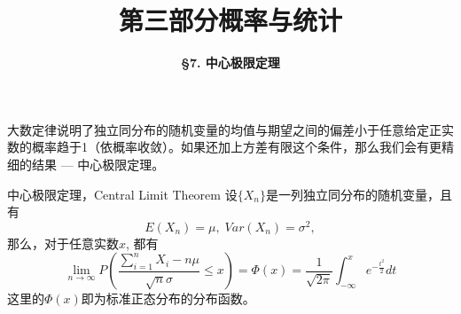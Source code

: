 \documentclass[10pt]{beamer}
\title[Probability \& Statistics]{\LARGE \bfseries 第三部分\quad 概率与统计} %
\author[Central Limit Theorem] %
{\Large \bfseries \S 7. 中心极限定理}
\date{}
\begin{document}

\begin{frame}

\titlepage %

\end{frame}





\begin{frame}

{
\large
大数定律说明了独立同分布的随机变量的均值与期望之间的偏差小于任意给定正实数的概率趋于1（依概率收敛）。如果还加上方差有限这个条件，那么我们会有更精细的结果 --- 中心极限定理。
}

\end{frame}


\begin{frame}

\begin{block}{中心极限定理，Central Limit Theorem}
设$\{X_n\}$是一列独立同分布的随机变量，且有
$$E(X_n) = \mu, \; Var(X_n) = \sigma^2,$$
那么，对于任意实数$x$, 都有
$$\lim\limits_{n\to\infty} P\left( \dfrac{\sum\limits_{i=1}^n X_i - n\mu}{\sqrt{n}\sigma} \le x \right) = \Phi(x) = \dfrac{1}{\sqrt{2\pi}} \int_{-\infty}^x e^{-\frac{t^2}{2}} dt$$
这里的$\Phi(x)$即为标准正态分布的分布函数。
\end{block}

\end{frame}
\end{document}
